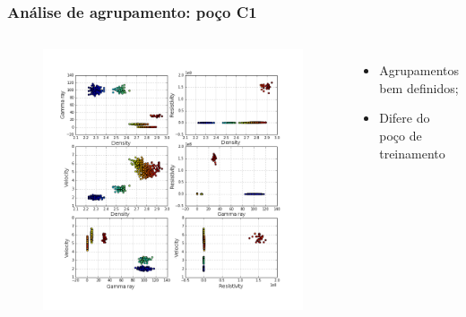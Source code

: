 \documentclass[aspectratio=10]{beamer} %
\begin{document}
\begin{frame}
	\frametitle{Análise de agrupamento: poço C1}
	
	\begin{columns}
		\footnotesize
		\justifying
		\begin{figure}
			\includegraphics[scale=0.268]{Imagens/cluterpocoC1.png}
		\end{figure}
		
		\begin{itemize}
			\footnotesize
			\item Agrupamentos bem definidos;
			\pause
			\item Difere do poço de treinamento
		\end{itemize}
		
	\end{columns}
\end{frame}
\end{document}
